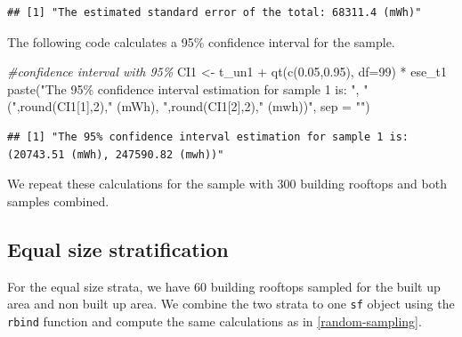 \documentclass[
]{book}
\newenvironment{Shaded}{\begin{snugshade}}{\end{snugshade}}
\newcommand{\AttributeTok}[1]{\textcolor[rgb]{0.77,0.63,0.00}{#1}}
\newcommand{\CommentTok}[1]{\textcolor[rgb]{0.56,0.35,0.01}{\textit{#1}}}
\newcommand{\DecValTok}[1]{\textcolor[rgb]{0.00,0.00,0.81}{#1}}
\newcommand{\FloatTok}[1]{\textcolor[rgb]{0.00,0.00,0.81}{#1}}
\newcommand{\FunctionTok}[1]{\textcolor[rgb]{0.00,0.00,0.00}{#1}}
\newcommand{\NormalTok}[1]{#1}
\newcommand{\OtherTok}[1]{\textcolor[rgb]{0.56,0.35,0.01}{#1}}
\newcommand{\SpecialCharTok}[1]{\textcolor[rgb]{0.00,0.00,0.00}{#1}}
\newcommand{\StringTok}[1]{\textcolor[rgb]{0.31,0.60,0.02}{#1}}
\begin{document}
\begin{verbatim}
## [1] "The estimated standard error of the total: 68311.4 (mWh)"
\end{verbatim}

The following code calculates a 95\% confidence interval for the sample.

\begin{Shaded}
\begin{Highlighting}[]
\CommentTok{\#confidence interval with 95\% }
\NormalTok{CI1 }\OtherTok{\textless{}{-}}\NormalTok{ t\_un1 }\SpecialCharTok{+} \FunctionTok{qt}\NormalTok{(}\FunctionTok{c}\NormalTok{(}\FloatTok{0.05}\NormalTok{,}\FloatTok{0.95}\NormalTok{), }\AttributeTok{df=}\DecValTok{99}\NormalTok{) }\SpecialCharTok{*}\NormalTok{ ese\_t1}
\FunctionTok{paste}\NormalTok{(}\StringTok{"The 95\% confidence interval estimation for sample 1 is: "}\NormalTok{, }\StringTok{"("}\NormalTok{,}\FunctionTok{round}\NormalTok{(CI1[}\DecValTok{1}\NormalTok{],}\DecValTok{2}\NormalTok{),}\StringTok{" (mWh), "}\NormalTok{,}\FunctionTok{round}\NormalTok{(CI1[}\DecValTok{2}\NormalTok{],}\DecValTok{2}\NormalTok{),}\StringTok{" (mwh))"}\NormalTok{, }\AttributeTok{sep =} \StringTok{""}\NormalTok{)}
\end{Highlighting}
\end{Shaded}

\begin{verbatim}
## [1] "The 95% confidence interval estimation for sample 1 is: (20743.51 (mWh), 247590.82 (mwh))"
\end{verbatim}

We repeat these calculations for the sample with 300 building rooftops and both samples combined.

\hypertarget{equal-size-stratification}{%
\subsection{Equal size stratification}\label{equal-size-stratification}}

For the equal size strata, we have 60 building rooftops sampled for the built up area and non built up area. We combine the two strata to one \texttt{sf} object using the \texttt{rbind} function and compute the same calculations as in \ref{random-sampling}.
\end{document}
